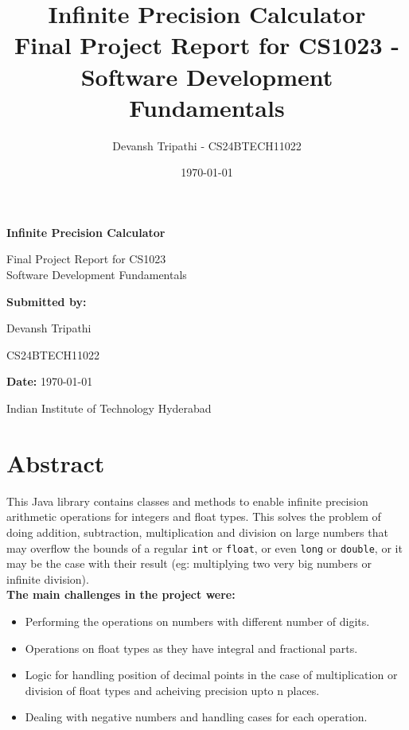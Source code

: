 \documentclass[15pt]{article}
\title{Infinite Precision Calculator\\ \large Final Project Report for CS1023 - Software Development Fundamentals}
\author{Devansh Tripathi - CS24BTECH11022}
\date{\today}
\begin{document}
\begin{titlepage}
    \centering
    \vspace*{2cm}

    {\huge \bfseries Infinite Precision Calculator \par}
    \vspace{0.5cm}

    {\Large Final Project Report for CS1023\\Software Development Fundamentals \par}
    \vspace{1.5cm}

    {\Large \textbf{Submitted by:} \par} 
    \vspace{0.3cm}
    {\large Devansh Tripathi \par} 
    {\large CS24BTECH11022 \par} 
    \vspace{2cm}

    {\large \textbf{Date:} \today \par} 

    \vfill
    {\large Indian Institute of Technology Hyderabad \par}
\end{titlepage}

\newpage
\section{Abstract}

This Java library contains classes and methods to enable infinite precision arithmetic 
operations for integers and float types. This solves the problem of doing addition, 
subtraction, multiplication and division on large numbers that may overflow the bounds 
of a regular \texttt{int} or \texttt{float}, or even \texttt{long} or \texttt{double}, or it may be the case with 
their result (eg: multiplying two very big numbers or infinite division).\\

\textbf{The main challenges in the project were:}
\begin{itemize}
    \item Performing the operations on numbers with different number of digits.
    \item Operations on float types as they have integral and fractional parts.
    \item Logic for handling position of decimal points in the case of multiplication or division of float types and acheiving precision upto n places.
    \item Dealing with negative numbers and handling cases for each operation.
\end{itemize}
\end{document}
